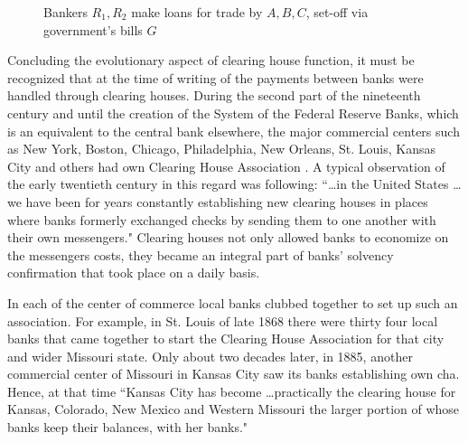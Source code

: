 \begin{figure}[!ht]
\caption[Bankers $R_1, R_2$ make loans for trade by $A,B,C$, set-off via $G$]%
{Bankers $R_1, R_2$ make loans for trade by $A,B,C$, set-off via government's bills $G$}
\label{fig:bank_mk_loan4}
\vspace{.1in}
\end{figure}

Concluding the evolutionary aspect of clearing house function, it must be recognized that at the time of writing of \cite{innes1910,innes1913,innes1914} the payments between banks were handled through clearing houses. During the second part of the nineteenth century and until the creation of the System of the Federal Reserve Banks, which is an equivalent to the central bank elsewhere, the major commercial centers such as New York, Boston, Chicago, Philadelphia, New Orleans, St. Louis, Kansas City and others had own Clearing House Association \citep[p.~104]{hubbard1969}. A typical observation of the early twentieth century in this regard was following: ``\dots in the United States \dots we have been for years constantly establishing new clearing houses in places where banks formerly exchanged checks by sending them to one another with their own messengers." \citep[p.~7]{kinley1911} Clearing houses not only allowed banks to economize on the messengers costs, they became an integral part of banks' solvency confirmation that took place on a daily basis.

In each of the center of commerce local banks clubbed together to set up such an association. For example,  in St. Louis of late 1868 there were thirty four local banks that came together to start the Clearing House Association for that city and wider Missouri state. Only about two decades later, in 1885, another commercial center of Missouri in Kansas City saw its banks establishing own \acf{cha}. Hence, at that time ``Kansas City has become \dots practically the clearing house for Kansas, Colorado, New Mexico and Western Missouri the larger portion of whose banks keep their balances, with her banks." \citep[p.~281]{case1888} 

